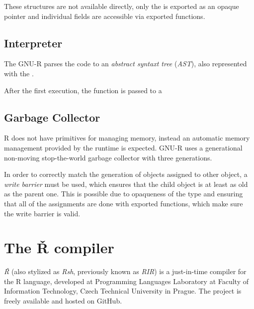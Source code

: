 These structures are not available directly, only the \SEXP is exported as an opaque pointer and individual fields are accessible via exported functions.


\subsection{Interpreter}

The GNU-R parses the code to an \textit{abstract syntaxt tree} (\textit{AST}), also represented with the \SEXP.

After the first execution, the function is passed to a

\subsection{Garbage Collector}
R does not have primitives for managing memory, instead an automatic memory management provided by the runtime is expected. GNU-R uses a generational non-moving stop-the-world garbage collector with three generations. 

In order to correctly match the generation of objects assigned to other object, a \textit{write barrier} must be used, which ensures that the child object is at least as old as the parent one. This is possible due to opaqueness of the \SEXP type and ensuring that all of the assignments are done with exported functions, which make sure the write barrier is valid.

\section{The Ř compiler}

\textit{Ř} (also stylized as \textit{Rsh}, previously known as \textit{RIR}) is a just-in-time compiler for the R language, developed at Programming Languages Laboratory at Faculty of Information Technology, Czech Technical University in Prague\todocite{}. The project is freely available and hosted on GitHub.

